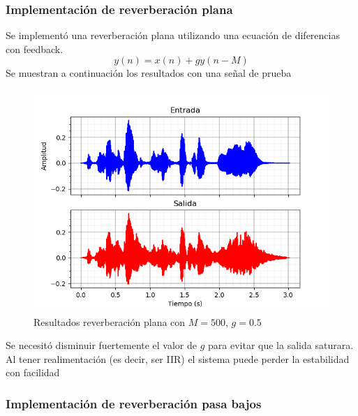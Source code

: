 \documentclass[assd_tp2_main.tex]{subfiles}
\begin{document}
\subsubsection{Implementación de reverberación plana}
Se implementó una reverberación plana utilizando una ecuación de diferencias con feedback. 
\begin{equation}
	y(n)=x(n)+gy(n-M)
\end{equation}
Se muestran a continuación los resultados con una señal de prueba
\begin{figure}[H]	
	\centering
	\includegraphics[scale=1]{graficos/EJ8/eco_plano.png}
	\caption{Resultados reverberación plana con $M=500$, $g=0.5$ }
	\label{fig:bloqueElemental}
\end{figure}
Se necesitó disminuir fuertemente el valor de $g$ para evitar que la salida saturara. Al tener realimentación (es decir, ser IIR) el sistema puede perder la estabilidad con facilidad

\subsubsection{Implementación de reverberación pasa bajos}
\end{document}
